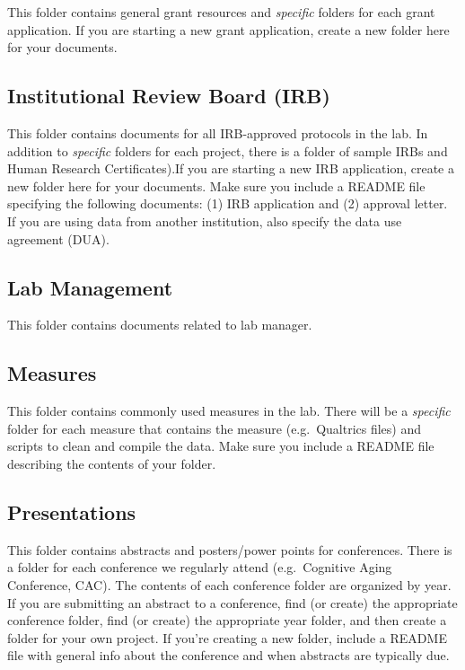 \documentclass[]{book}
\begin{document}
This folder contains general grant resources and \emph{specific} folders for each grant application. If you are starting a new grant application, create a new folder here for your documents.

\hypertarget{institutional-review-board-irb}{%
\subsection{Institutional Review Board (IRB)}\label{institutional-review-board-irb}}

This folder contains documents for all IRB-approved protocols in the lab. In addition to \emph{specific} folders for each project, there is a folder of sample IRBs and Human Research Certificates).If you are starting a new IRB application, create a new folder here for your documents. Make sure you include a README file specifying the following documents: (1) IRB application and (2) approval letter. If you are using data from another institution, also specify the data use agreement (DUA).

\hypertarget{lab-management}{%
\subsection{Lab Management}\label{lab-management}}

This folder contains documents related to lab manager.

\hypertarget{measures}{%
\subsection{Measures}\label{measures}}

This folder contains commonly used measures in the lab. There will be a \emph{specific} folder for each measure that contains the measure (e.g.~Qualtrics files) and scripts to clean and compile the data. Make sure you include a README file describing the contents of your folder.

\hypertarget{presentations}{%
\subsection{Presentations}\label{presentations}}

This folder contains abstracts and posters/power points for conferences. There is a folder for each conference we regularly attend (e.g.~Cognitive Aging Conference, CAC). The contents of each conference folder are organized by year. If you are submitting an abstract to a conference, find (or create) the appropriate conference folder, find (or create) the appropriate year folder, and then create a folder for your own project. If you're creating a new folder, include a README file with general info about the conference and when abstracts are typically due.
\end{document}
